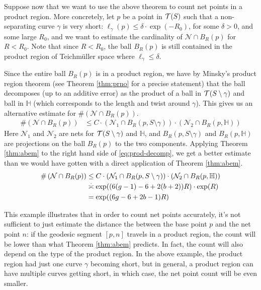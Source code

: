 \documentclass[12pt, reqno]{amsart}
\begin{document}
Suppose now that we want to use the above theorem to count net points in a product region.
More concretely, let $p$ be a point in $\mathcal{T}(S)$ such that a non-separating curve $\gamma$ is very short: $\ell_{\gamma}(p) \leq \delta \cdot \exp(-R_0)$, for some $\delta > 0$, and some large $R_0$, and we want to estimate the cardinality of $\mathcal{N} \cap B_R(p)$ for $R < R_0$.
Note that since $R < R_0$, the ball $B_R(p)$ is still contained in the product region of Teichmüller space where $\ell_\gamma \leq \delta$.

Since the entire ball $B_R(p)$ is in a product region, we have by Minsky's product region theorem (see Theorem \ref{thm:prno} for a precise statement) that the ball decomposes (up to an additive error) as the
product of a ball in $\mathcal{T}(S \setminus \gamma)$ and ball in $\mathbb{H}$ (which corresponds to the length and twist around $\gamma$).
This gives us an alternative estimate for $\#\left( \mathcal{N} \cap B_R(p)\right)$.
\begin{align}
  \label{eq:prod-decomp}
  \#\left( \mathcal{N} \cap B_R(p) \right) &\leq C \cdot \left( \mathcal{N}_1 \cap B_R(p, S \setminus \gamma) \right) \cdot \left( \mathcal{N}_2 \cap B_R(p, \mathbb{H})\right)
\end{align}
Here $\mathcal{N}_1$ and $\mathcal{N}_2$ are nets for $\mathcal{T}(S \setminus \gamma)$ and $\mathbb{H}$, and $B_R(p, S \setminus \gamma)$ and $B_R(p, \mathbb{H})$ are projections on the ball $B_R(p)$ to the two components.
Applying Theorem \ref{thm:abem} to the right hand side of \eqref{eq:prod-decomp}, we get a better estimate than we would have gotten with a direct application of Theorem \ref{thm:abem}.
\begin{align*}
  \#\left( \mathcal{N} \cap B_R(p) \right) &\leq C \cdot \left( \mathcal{N}_1 \cap B_R(p, S \setminus \gamma) \right) \cdot \left( \mathcal{N}_2 \cap B_R(p, \mathbb{H})\right) \\
                                           &\emul \exp((6(g-1)-6 + 2(b+2))R) \cdot \exp(R) \\
  &= \exp((6g-6+2b-1)R)
\end{align*}

This example illustrates that in order to count net points accurately, it's not sufficient to just estimate the distance the between the base point $p$ and the net point $n$: if the geodesic segment $[p, n]$ travels in a product region, the count will be lower than what Theorem \ref{thm:abem} predicts.
In fact, the count will also depend on the type of the product region.
In the above example, the product region had just one curve $\gamma$ becoming short, but in general, a product region can have multiple curves getting short, in which case, the net point count will be even smaller.
\end{document}
